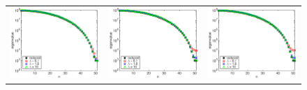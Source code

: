 \documentclass{iopart}
\begin{document}
\begin{figure}
\centering
\begin{tabular}{ccc}
\includegraphics[scale=.2]{./figs/example2_a}&
\includegraphics[scale=.2]{./figs/example2_b}&
\includegraphics[scale=.2]{./figs/example2_c}\\

\end{tabular}
\end{figure}
\end{document}
